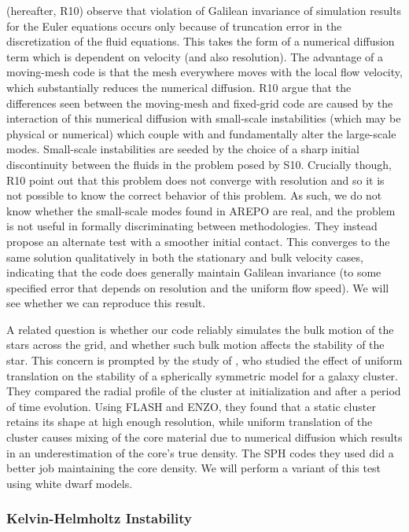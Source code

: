 \documentclass[iop]{../emulateapj}
\begin{document}
\citet{robertson:2010} (hereafter, R10) observe that violation of Galilean
invariance of simulation results for the Euler equations occurs only
because of truncation error in the discretization of the fluid
equations. This takes the form of a numerical diffusion term which is
dependent on velocity (and also resolution). The advantage of a
moving-mesh code is that the mesh everywhere moves with the local flow
velocity, which substantially reduces the numerical
diffusion. R10 argue that the differences seen
between the moving-mesh and fixed-grid code are caused by the
interaction of this numerical diffusion with small-scale instabilities
(which may be physical or numerical) which couple with and
fundamentally alter the large-scale modes. Small-scale instabilities
are seeded by the choice of a sharp initial discontinuity between the 
fluids in the problem posed by S10. Crucially though,
R10 point out that this problem does not
converge with resolution and so it is not possible to know the correct
behavior of this problem. As such, we do not know whether the
small-scale modes found in AREPO are real, and the problem is not
useful in formally discriminating between methodologies. They instead
propose an alternate test with a smoother initial contact. This
converges to the same solution qualitatively in both the stationary
and bulk velocity cases, indicating that the code does generally
maintain Galilean invariance (to some specified error that depends on
resolution and the uniform flow speed).  We will see whether we can
reproduce this result.

A related question is whether our code reliably simulates the bulk
motion of the stars across the grid, and whether such bulk motion
affects the stability of the star. This concern is prompted by the
study of \cite{tasker:2008}, who studied the effect of uniform
translation on the stability of a spherically symmetric model for a
galaxy cluster. They compared the radial profile of the cluster at
initialization and after a period of time evolution. Using FLASH and
ENZO, they found that a static cluster retains its shape at high
enough resolution, while uniform translation of the cluster causes
mixing of the core material due to numerical diffusion which results
in an underestimation of the core's true density. The SPH codes they
used did a better job maintaining the core density. We will perform a
variant of this test using white dwarf models.

\subsubsection{Kelvin-Helmholtz Instability}\label{sec:khi}
\end{document}
